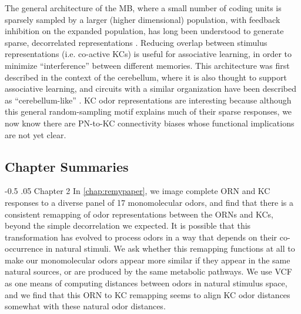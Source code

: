 \documentclass[12pt]{caltech_thesis}
\makeatletter
\renewcommand{\cite}{{ }\autocite}
\let\Oldsubsection\subsection
\renewcommand{\subsection}{\FloatBarrier\Oldsubsection}
\renewcommand\paragraph{%
    \@startsection{paragraph}{4}{0mm}%
       {-0.5\baselineskip}%
       {.05\baselineskip}%
       {\normalfont\normalsize\itshape}}
\makeatother
\begin{document}
\begin{refsection}
The general architecture of the MB, where a small number of coding units is sparsely sampled by a larger (higher dimensional) population, with feedback inhibition on the expanded population, has long been understood to generate sparse, decorrelated representations\cite{Marr1969,Albus1971}.
Reducing overlap between stimulus representations (i.e. co-active KCs) is useful for associative learning, in order to minimize ``interference'' between different memories.
This architecture was first described in the context of the cerebellum, where it is also thought to support associative learning, and circuits with a similar organization have been described as ``cerebellum-like''\cite{KennedyThesis}.
KC odor representations are interesting because although this general random-sampling motif explains much of their sparse responses, we now know there are PN-to-KC connectivity biases whose functional implications are not yet clear.

\subsection{Chapter Summaries}
\paragraph{Chapter 2}
In \autoref{chap:remypaper}, we image complete ORN and KC responses to a diverse panel of 17 monomolecular odors, and find that there is a consistent remapping of odor representations between the ORNs and KCs, beyond the simple decorrelation we expected.
It is possible that this transformation has evolved to process odors in a way that depends on their co-occurrence in natural stimuli.
We ask whether this remapping functions at all to make our monomolecular odors appear more similar if they appear in the same natural sources, or are produced by the same metabolic pathways.
We use VCF as one means of computing distances between odors in natural stimulus space, and we find that this ORN to KC remapping seems to align KC odor distances somewhat with these natural odor distances.


\end{refsection}
\end{document}
